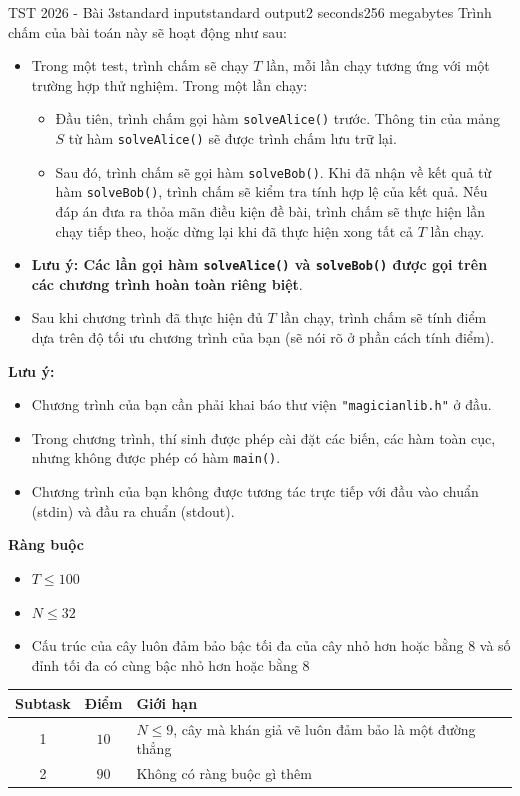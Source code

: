 \begin{problem}{TST 2026 - Bài 3}{standard input}{standard output}{2 seconds}{256 megabytes}
Trình chấm của bài toán này sẽ hoạt động như sau:
\begin{itemize}
   \item Trong một test, trình chấm sẽ chạy $T$ lần, mỗi lần chạy tương ứng với một trường hợp thử nghiệm. Trong một lần chạy:
   \begin{itemize}
      \item Đầu tiên, trình chấm gọi hàm \texttt{solveAlice()} trước. Thông tin của mảng $S$ từ hàm \texttt{solveAlice()} sẽ được trình chấm lưu trữ lại.
      \item Sau đó, trình chấm sẽ gọi hàm \texttt{solveBob()}. Khi đã nhận về kết quả từ hàm \texttt{solveBob()}, trình chấm sẽ kiểm tra tính hợp lệ của kết quả. Nếu đáp án đưa ra thỏa mãn điều kiện đề bài, trình chấm sẽ thực hiện lần chạy tiếp theo, hoặc dừng lại khi đã thực hiện xong tất cả $T$ lần chạy.
   \end{itemize}
   \item \textbf{Lưu ý: Các lần gọi hàm \texttt{solveAlice()} và \texttt{solveBob()} được gọi trên các chương trình hoàn toàn riêng biệt}.
   \item Sau khi chương trình đã thực hiện đủ $T$ lần chạy, trình chấm sẽ tính điểm dựa trên độ tối ưu chương trình của bạn (sẽ nói rõ ở phần cách tính điểm).
\end{itemize}

\textbf{Lưu ý:}
\begin{itemize}
   \item Chương trình của bạn cần phải khai báo thư viện \texttt{"magicianlib.h"} ở đầu.
   \item Trong chương trình, thí sinh được phép cài đặt các biến, các hàm toàn cục, nhưng không được phép có hàm \texttt{main()}.
   \item Chương trình của bạn không được tương tác trực tiếp với đầu vào chuẩn (stdin) và đầu ra chuẩn (stdout).
\end{itemize}

\textbf{Ràng buộc}
\begin{itemize}
   \item $T\le 100$
   \item $N\le 32$
   \item Cấu trúc của cây luôn đảm bảo bậc tối đa của cây nhỏ hơn hoặc bằng $8$ và số đỉnh tối đa có cùng bậc nhỏ hơn hoặc bằng $8$
\end{itemize}

\Scoring
\begin{center}
  \begin{tabular}{|c|c|l|} \hline
    \textbf{Subtask} & \textbf{Điểm} & \textbf{Giới hạn} \\ \hline
    1 & $10$ & $N\le 9$, cây mà khán giả vẽ luôn đảm bảo là một đường thẳng \\ \hline
    2 & $90$ & Không có ràng buộc gì thêm \\ \hline
  \end{tabular}
\end{center}


\end{problem}
